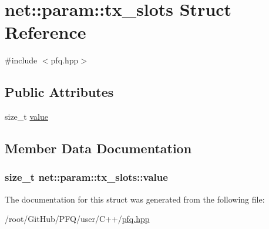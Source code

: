 \hypertarget{structnet_1_1param_1_1tx__slots}{\section{net\-:\-:param\-:\-:tx\-\_\-slots Struct Reference}
\label{structnet_1_1param_1_1tx__slots}
}


{\ttfamily \#include $<$pfq.\-hpp$>$}

\subsection*{Public Attributes}
\begin{DoxyCompactItemize}
\item 
size\-\_\-t \hyperlink{structnet_1_1param_1_1tx__slots_aa9c38079016460b21e406579485f94a1}{value}
\end{DoxyCompactItemize}


\subsection{Member Data Documentation}
\hypertarget{structnet_1_1param_1_1tx__slots_aa9c38079016460b21e406579485f94a1}{
\subsubsection[{value}]{\setlength{\rightskip}{0pt plus 5cm}size\-\_\-t net\-::param\-::tx\-\_\-slots\-::value}}\label{structnet_1_1param_1_1tx__slots_aa9c38079016460b21e406579485f94a1}


The documentation for this struct was generated from the following file\-:\begin{DoxyCompactItemize}
\item 
/root/\-Git\-Hub/\-P\-F\-Q/user/\-C++/\hyperlink{pfq_8hpp}{pfq.\-hpp}\end{DoxyCompactItemize}
